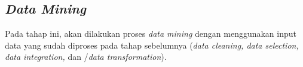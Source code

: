 



\subsection{\textsl{Data Mining}}

Pada tahap ini, akan dilakukan proses \textsl{data mining} dengan menggunakan input data yang sudah diproses pada tahap sebelumnya (\textsl{data cleaning, data selection, data integration,} dan /\textsl{data transformation}).

